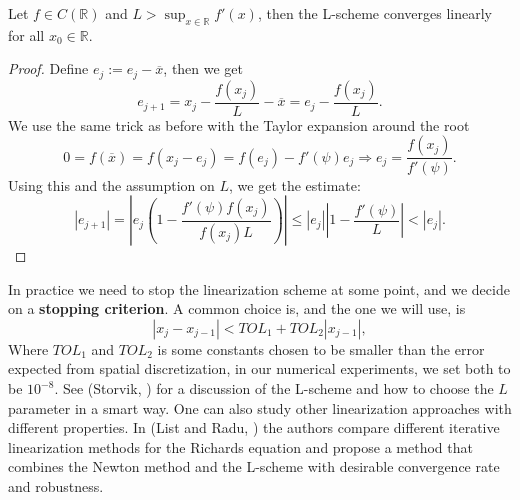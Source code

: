 \documentclass[../Main/main.tex]{subfiles}
\begin{document}
\begin{theorem}
	Let $f\in C(\mathbb{R})$ and $L>\sup_{x\in\mathbb{R}}f'(x)$, then the L-scheme converges linearly for all $x_0\in \mathbb{R}$.
\end{theorem}
\begin{proof}
	Define $e_j := e_j-\overline{x}$, then we get
	\begin{equation}
		e_{j+1} = x_j-\frac{f(x_j)}{L}-\overline{x}=e_j-\frac{f(x_j)}{L}.
	\end{equation}
	We use the same trick as before with the Taylor expansion around the root
	\begin{equation}
		0 = f(\overline{x}) = f(x_j-e_j) = f(e_j)-f'(\psi)e_j\Rightarrow e_j = \frac{f(x_j)}{f'(\psi)}.
	\end{equation}
	Using this and the assumption on $L$, we get the estimate:
	\begin{equation}
		|e_{j+1}|=\left |e_j \left (1-\frac{f'(\psi)f(x_j)}{f(x_j)L}\right )\right|\leq|e_j|\left|1-\frac{f'(\psi)}{L}\right|<|e_j|.
	\end{equation}
\end{proof}
In practice we need to stop the linearization scheme at some point, and we decide on a \textbf{stopping criterion}. A common choice is, and the one we will use, is
\begin{equation}\label{eq:stopping_criterion}
	|x_{j}-x_{j-1}|<TOL_1+TOL_2|x_{j-1}|,
\end{equation}
Where $TOL_1$ and $TOL_2$ is some constants chosen to be smaller than the error expected from spatial discretization, in our numerical experiments, we set both to be $10^{-8}$. See (Storvik, \cite{Erlend}) for a discussion of the L-scheme and how to choose the $L$ parameter in a smart way. One can also study other linearization approaches with different properties. In (List and Radu, \cite{list2016study}) the authors compare different iterative linearization methods for the Richards equation and propose a method that combines the Newton method and the L-scheme with desirable convergence rate and robustness. 
\end{document}
